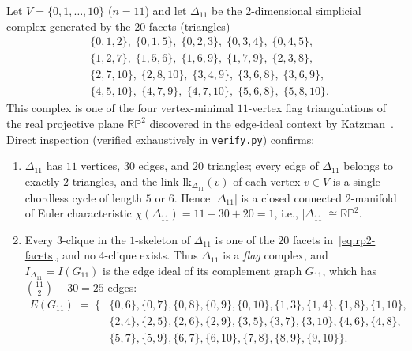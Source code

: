 \documentclass[11pt,a4paper]{amsart}
\theoremstyle{plain}
\theoremstyle{definition}
\newcommand{\lk}{\mathrm{lk}}
\newcommand{\RP}{\mathbb{RP}}
\begin{document}
Let $V = \{0, 1, \dots, 10\}$ ($n = 11$) and let $\Delta_{11}$ be the $2$-dimensional simplicial complex generated by the $20$ facets (triangles)
\begin{equation}\label{eq:rp2-facets}
\begin{aligned}
  &\{0,1,2\},\; \{0,1,5\},\; \{0,2,3\},\; \{0,3,4\},\; \{0,4,5\},\\
  &\{1,2,7\},\; \{1,5,6\},\; \{1,6,9\},\; \{1,7,9\},\; \{2,3,8\},\\
  &\{2,7,10\},\; \{2,8,10\},\; \{3,4,9\},\; \{3,6,8\},\; \{3,6,9\},\\
  &\{4,5,10\},\; \{4,7,9\},\; \{4,7,10\},\; \{5,6,8\},\; \{5,8,10\}.
\end{aligned}
\end{equation}
This complex is one of the four vertex-minimal $11$-vertex flag triangulations of the real projective plane $\RP^2$ discovered in the edge-ideal context by Katzman~\cite[Section~3]{Katzman2006}. Direct inspection (verified exhaustively in \texttt{verify.py}) confirms:
\begin{enumerate}
  \item[(1)] $\Delta_{11}$ has $11$ vertices, $30$ edges, and $20$ triangles; every edge of $\Delta_{11}$ belongs to exactly $2$ triangles, and the link $\lk_{\Delta_{11}}(v)$ of each vertex $v \in V$ is a single chordless cycle of length $5$ or $6$. Hence $|\Delta_{11}|$ is a closed connected $2$-manifold of Euler characteristic $\chi(\Delta_{11}) = 11 - 30 + 20 = 1$, i.e., $|\Delta_{11}| \cong \RP^2$.
  \item[(2)] Every $3$-clique in the $1$-skeleton of $\Delta_{11}$ is one of the $20$ facets in~\eqref{eq:rp2-facets}, and no $4$-clique exists. Thus $\Delta_{11}$ is a \emph{flag} complex, and $I_{\Delta_{11}} = I(G_{11})$ is the edge ideal of its complement graph $G_{11}$, which has $\binom{11}{2} - 30 = 25$ edges:
  \begin{align*}
    E(G_{11}) \;=\; \bigl\{
    &\{0,6\},\{0,7\},\{0,8\},\{0,9\},\{0,10\},\{1,3\},\{1,4\},\{1,8\},\{1,10\},\\
    &\{2,4\},\{2,5\},\{2,6\},\{2,9\},\{3,5\},\{3,7\},\{3,10\},\{4,6\},\{4,8\},\\
    &\{5,7\},\{5,9\},\{6,7\},\{6,10\},\{7,8\},\{8,9\},\{9,10\} \bigr\}.
  \end{align*}
\end{enumerate}
\end{document}
